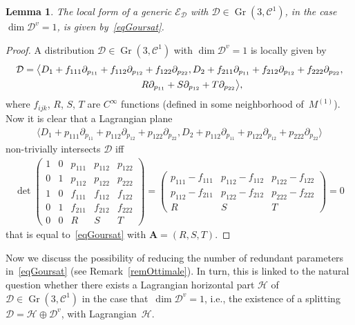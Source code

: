 \documentclass[pdftex]{sigma}
\newcommand{\C}{\mathcal{C}}
\newcommand{\D}{\mathcal{D}}
\newcommand{\A}{\boldsymbol{A}}
\newcommand{\E}{\mathcal{E}}
\newcommand{\Gr}{\operatorname{Gr}}
\numberwithin{equation}{section}
\newtheorem{Lemma}[Theorem]{Lemma}
\begin{document}
\begin{Lemma}
\label{Lemma-ex-Considerazioni-Forma-Generale}
The local form of a generic $\E_\D$ with $\D\in\Gr(3, \C^1)$, in the case $\dim\D^v=1$, is given by~\eqref{eqGoursat}.
\end{Lemma}
\begin{proof}
A distribution $\D\in\Gr(3, \C^1)$ with $\dim\D^v=1$ is locally given by
\begin{gather*}
\D=\big\langle D_1+f_{111}\partial_{p_{11}} +f_{112}\partial_{p_{12}} +f_{122}\partial_{p_{22}} , D_2+f_{211}\partial_{p_{11}} +f_{212}\partial_{p_{12}} +f_{222}\partial_{p_{22}}, \\
\hphantom{\D=\big\langle}{} R\partial_{p_{11}} +S\partial_{p_{12}} +T\partial_{p_{22}} \big\rangle,
\end{gather*}
where $f_{ijk}$, $R$, $S$, $T$ are $C^\infty$ functions (def\/ined in some neighborhood of~$M^{(1)}$). Now it is clear that a Lagrangian plane
\begin{gather*}
\langle D_1+p_{111}\partial_{p_{11}} +p_{112}\partial_{p_{12}} +p_{122}\partial_{p_{22}} , D_2+p_{112}\partial_{p_{11}} +p_{122}\partial_{p_{12}} +p_{222}\partial_{p_{22}} \rangle
\end{gather*}
non-trivially intersects $\D$ if\/f
\begin{gather*}
\det
\left(
\begin{matrix}
1 & 0 & p_{111} & p_{112} & p_{122}
\\
0 & 1 & p_{112} & p_{122} & p_{222}
\\
1 & 0 & f_{111} & f_{112} & f_{122}
\\
0 & 1 & f_{211} & f_{212} & f_{222}
\\
0 & 0 & R & S & T
\end{matrix}
\right)
=
\left(
\begin{matrix}
p_{111}-f_{111} & p_{112}-f_{112} & p_{122}-f_{122}
\\
p_{112}-f_{211} & p_{122}-f_{212} & p_{222}-f_{222}
\\
R & S & T
\end{matrix}
\right)=0
\end{gather*}
that is equal to~\eqref{eqGoursat} with $\A=(R,S,T)$.
\end{proof}

Now we discuss the possibility of reducing the number of redundant parameters in~\eqref{eqGoursat} (see Remark~\ref{remOttimale}). In turn, this is linked to the natural question whether there exists a Lagrangian horizontal part $\mathcal{H}$ of $\mathcal{D}\in\Gr(3,\C^1)$ in the case that~$\dim\mathcal{D}^v=1$, i.e., the existence of a splitting $\mathcal{D}=\mathcal{H}\oplus\mathcal{D}^v$, with Lagrangian~$\mathcal{H}$.
\end{document}
